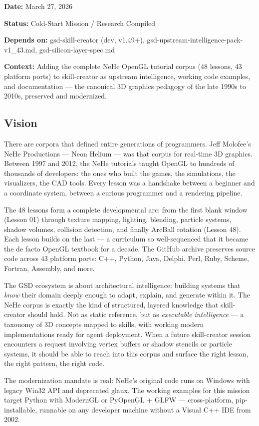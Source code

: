 \documentclass[11pt,letterpaper]{article}
\newcommand{\metafield}[2]{\textbf{\sffamily #1} #2\par}
\begin{document}
\metafield{Date:}{March 27, 2026}
\metafield{Status:}{Cold-Start Mission / Research Compiled}
\metafield{Depends on:}{gsd-skill-creator (dev, v1.49+), gsd-upstream-intelligence-pack-v1\_43.md, gsd-silicon-layer-spec.md}
\metafield{Context:}{Adding the complete NeHe OpenGL tutorial corpus (48 lessons, 43 platform ports) to skill-creator as upstream intelligence, working code examples, and documentation --- the canonical 3D graphics pedagogy of the late 1990s to 2010s, preserved and modernized.}

\subsection{Vision}

There are corpora that defined entire generations of programmers. Jeff Molofee's NeHe Productions --- Neon Helium --- was that corpus for real-time 3D graphics. Between 1997 and 2012, the NeHe tutorials taught OpenGL to hundreds of thousands of developers: the ones who built the games, the simulations, the visualizers, the CAD tools. Every lesson was a handshake between a beginner and a coordinate system, between a curious programmer and a rendering pipeline.

The 48 lessons form a complete developmental arc: from the first blank window (Lesson 01) through texture mapping, lighting, blending, particle systems, shadow volumes, collision detection, and finally ArcBall rotation (Lesson 48). Each lesson builds on the last --- a curriculum so well-sequenced that it became the de facto OpenGL textbook for a decade. The GitHub archive preserves source code across 43 platform ports: C++, Python, Java, Delphi, Perl, Ruby, Scheme, Fortran, Assembly, and more.

The GSD ecosystem is about architectural intelligence: building systems that \textit{know} their domain deeply enough to adapt, explain, and generate within it. The NeHe corpus is exactly the kind of structured, layered knowledge that skill-creator should hold. Not as static reference, but as \textit{executable intelligence} --- a taxonomy of 3D concepts mapped to skills, with working modern implementations ready for agent deployment. When a future skill-creator session encounters a request involving vertex buffers or shadow stencils or particle systems, it should be able to reach into this corpus and surface the right lesson, the right pattern, the right code.

The modernization mandate is real: NeHe's original code runs on Windows with legacy Win32 API and deprecated glaux. The working examples for this mission target Python with ModernGL or PyOpenGL + GLFW --- cross-platform, pip-installable, runnable on any developer machine without a Visual C++ IDE from 2002.
\end{document}
